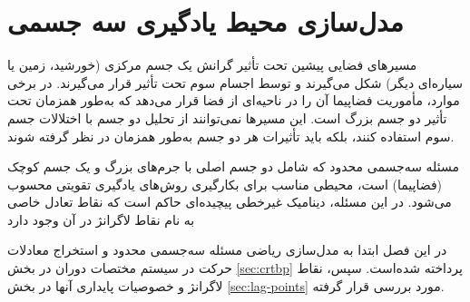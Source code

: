 %
%
%
%
%












\chapter{مدل‌سازی محیط یادگیری سه‌ جسمی}

مسیرهای فضایی پیشین تحت تأثیر گرانش یک جسم مرکزی (خورشید، زمین یا سیاره‌ای دیگر) شکل می‌گیرند و توسط اجسام سوم تحت تأثیر قرار می‌گیرند. 
در برخی موارد، مأموریت فضاپیما آن را در ناحیه‌ای از فضا قرار می‌دهد که به‌طور همزمان تحت تأثیر دو جسم بزرگ است. این مسیرها نمی‌توانند از تحلیل دو جسم با اختلالات جسم سوم استفاده کنند، بلکه باید تأثیرات هر دو جسم به‌طور همزمان در نظر گرفته شوند.

مسئله سه‌جسمی محدود که شامل دو جسم اصلی با جرم‌های بزرگ و یک جسم کوچک (فضاپیما) است، محیطی مناسب برای بکارگیری روش‌های یادگیری تقویتی محسوب می‌شود. در این مسئله، دینامیک غیرخطی پیچیده‌ای حاکم است که نقاط تعادل خاصی به نام نقاط لاگرانژ در آن وجود دارد

در این فصل ابتدا به مدل‌سازی ریاضی مسئله سه‌جسمی محدود و استخراج معادلات حرکت در سیستم مختصات دوران 
در بخش \ref{sec:crtbp}
پرداخته شده‌است. سپس، نقاط لاگرانژ و خصوصیات پایداری آنها  در بخش
\ref{sec:lag-points}
 مورد بررسی قرار گرفته. 









